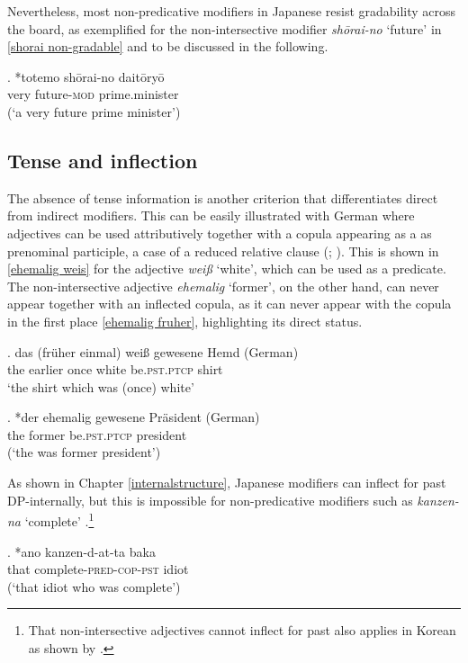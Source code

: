 \documentclass [output=book,colorlinks,citecolor=brown]{langscibook}
\begin{document}
Nevertheless, most non-predicative modifiers in Japanese resist gradability across the board, as exemplified for the non-intersective modifier \textit{shōrai-no} `future’ in \ref{shorai non-gradable} and to be discussed in the following.

\exg. *totemo shōrai-no daitōryō\\
very future-\textsc{mod} prime.minister\\
(`a very future prime minister’) \label{shorai non-gradable}

\subsection{Tense and inflection} \label{test tense}

The absence of tense information is another criterion that differentiates direct from indirect modifiers. This can be easily illustrated with German where adjectives can be used attributively together with a copula appearing as a as prenominal participle, a case of a reduced relative clause (\citealt[203]{cinque:2020:relcl}; \citealt{krause:2001:rrc, douglas:2016:syntactic, harwood:2018:rrc}). This is shown in \ref{ehemalig weis} for the adjective \textit{weiß} `white’, which can be used as a predicate. The non-intersective adjective \textit{ehemalig} `former’, on the other hand, can never appear together with an inflected copula, as it can never appear with the copula in the first place \ref{ehemalig fruher}, highlighting its direct status. %

\exg. das (früher einmal) weiß gewesene Hemd (German)\\
the earlier once white be.\textsc{pst.ptcp} shirt\\
`the shirt which was (once) white’ \label{ehemalig weis}

\exg. *der ehemalig gewesene Präsident (German)\\
the former be.\textsc{pst.ptcp} president\\
(`the was former president’) \label{ehemalig fruher}

As shown in Chapter \ref{internalstructure}, Japanese modifiers can inflect for past DP-internally, but this is impossible for non-predicative modifiers such as \textit{kanzen-na} `complete’ .\footnote{That non-intersective adjectives cannot inflect for past also applies in Korean as shown by \citet[164]{kang:2005:adj}.}

\exg. *ano kanzen-d-at-ta baka\\
that complete-\textsc{pred-cop-pst} idiot\\
(`that idiot who was complete’) \label{kanzendatta} \null \hfill \citep[109]{ayano:2010:revisiting}
\end{document}
